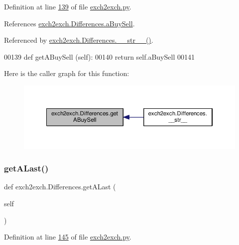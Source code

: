 Definition at line \hyperlink{exch2exch_8py_source_l00139}{139} of file \hyperlink{exch2exch_8py_source}{exch2exch.\+py}.



References \hyperlink{exch2exch_8py_source_l00121}{exch2exch.\+Differences.\+a\+Buy\+Sell}.



Referenced by \hyperlink{exch2exch_8py_source_l00154}{exch2exch.\+Differences.\+\_\+\+\_\+str\+\_\+\+\_\+()}.


\begin{DoxyCode}
00139     \textcolor{keyword}{def }getABuySell (self):
00140         \textcolor{keywordflow}{return} self.aBuySell
00141         
\end{DoxyCode}
Here is the caller graph for this function\+:
\nopagebreak
\begin{figure}[H]
\begin{center}
\leavevmode
\includegraphics[width=350pt]{classexch2exch_1_1_differences_a5b1000fb221e0726fb36a8e9a0655d84_icgraph}
\end{center}
\end{figure}
\mbox{\label{classexch2exch_1_1_differences_ae65d1f91ffad5d587a564d7160263b83}} 
\subsubsection{\texorpdfstring{get\+A\+Last()}{getALast()}}
{\footnotesize\ttfamily def exch2exch.\+Differences.\+get\+A\+Last (\begin{DoxyParamCaption}\item[{}]{self }\end{DoxyParamCaption})}



Definition at line \hyperlink{exch2exch_8py_source_l00145}{145} of file \hyperlink{exch2exch_8py_source}{exch2exch.\+py}.



